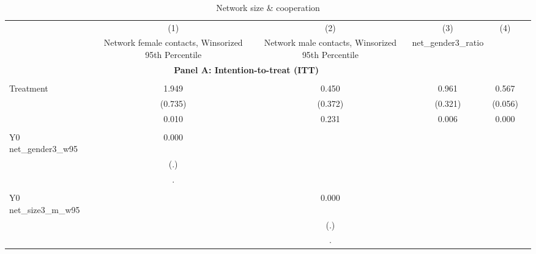 \begin{table}[!h] \centering \\ \caption{Network size & cooperation} \\ \begin{adjustbox}{width=\columnwidth,center} \\ \begin{tabular}{l*{5}{c}} \hline\hline
                    &\multicolumn{1}{c}{(1)}         &\multicolumn{1}{c}{(2)}         &\multicolumn{1}{c}{(3)}         &\multicolumn{1}{c}{(4)}         \\
                    &Network female contacts, Winsorized 95th Percentile         &Network male contacts, Winsorized 95th Percentile         &net\_gender3\_ratio         &%
\hline \\ \multicolumn{4}{c}{\textbf{Panel A: Intention-to-treat (ITT)}} \\\\[-1ex]
Treatment           &       1.949\sym{**} &       0.450         &       0.961\sym{***}&       0.567\sym{***}\\
                    &     (0.735)         &     (0.372)         &     (0.321)         &     (0.056)         \\
                    &       0.010         &       0.231         &       0.006         &       0.000         \\
                    &                     &                     &                     &                     \\
Y0 net\_gender3\_w95  &       0.000         &                     &                     &                     \\
                    &         (.)         &                     &                     &                     \\
                    &           .         &                     &                     &                     \\
                    &                     &                     &                     &                     \\
Y0 net\_size3\_m\_w95  &                     &       0.000         &                     &                     \\
                    &                     &         (.)         &                     &                     \\
                    &                     &           .         &                     &                     \\

\end{tabular}
\end{adjustbox}
\end{table}
